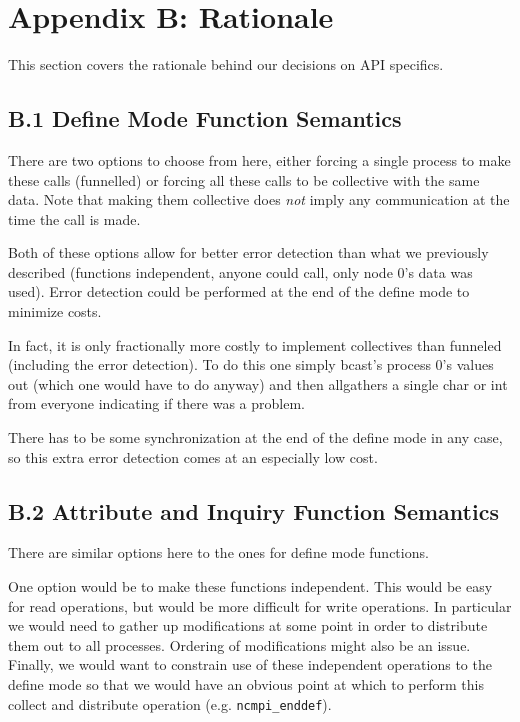 \documentclass[10pt]{article}
\begin{document}


%
%
\section*{Appendix B: Rationale}

This section covers the rationale behind our decisions on API specifics.

%
%
\subsection*{B.1  Define Mode Function Semantics}

There are two options to choose from here, either forcing a single process to
make these calls (funnelled) or forcing all these calls to be collective with
the same data.  Note that making them collective does \emph{not} imply any
communication at the time the call is made.

Both of these options allow for better error detection than what we
previously described (functions independent, anyone could call, only node
0's data was used).  Error detection could be performed at the end of the
define mode to minimize costs.

In fact, it is only fractionally more costly to implement collectives than
funneled (including the error detection).  To do this one simply bcast's
process 0's values out (which one would have to do anyway) and then
allgathers a single char or int from everyone indicating if there was a
problem.

There has to be some synchronization at the end of the define mode in any
case, so this extra error detection comes at an especially low cost.

\subsection*{B.2  Attribute and Inquiry Function Semantics}

There are similar options here to the ones for define mode functions.

One option would be to make these functions independent.  This would be easy
for read operations, but would be more difficult for write operations.  In
particular we would need to gather up modifications at some point in order to
distribute them out to all processes.  Ordering of modifications might also be
an issue.  Finally, we would want to constrain use of these independent
operations to the define mode so that we would have an obvious point at which
to perform this collect and distribute operation (e.g. \texttt{ncmpi\_enddef}).
\end{document}
